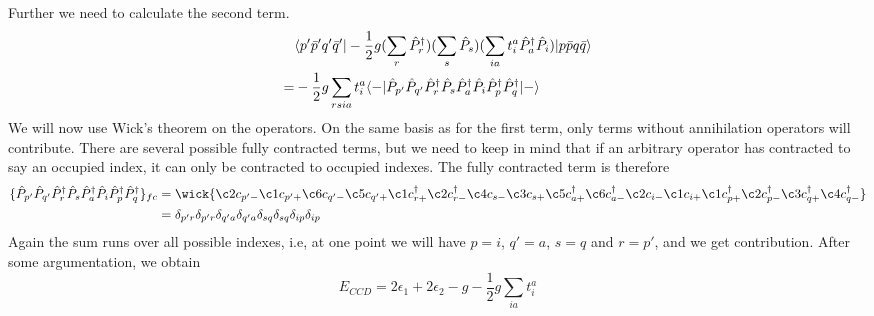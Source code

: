 \documentclass[norsk,a4paper,12pt]{article}
\begin{document}
Further we need to calculate the second term. 
\begin{align*}
&\langle p'\bar{p}'q'\bar{q}'|-\frac{1}{2}g(\sum_{r}\hat{P}_r^{\dagger})(\sum_s\hat{P}_s)(\sum_{ia}t_i^a\hat{P}_a^{\dagger}\hat{P}_i)|p\bar{p}q\bar{q}\rangle\notag\\
=&-\frac{1}{2}g\sum_{rsia}t_i^a\langle-|\hat{P}_{p'}\hat{P}_{q'}\hat{P}_r^{\dagger}\hat{P}_s\hat{P}_a^{\dagger}\hat{P}_i\hat{P}_p^{\dagger}\hat{P}_q^{\dagger}|-\rangle
\end{align*}
We will now use Wick's theorem on the operators. On the same basis as for the first term, only terms without annihilation operators will contribute. There are several possible fully contracted terms, but we need to keep in mind that if an arbitrary operator has contracted to say an occupied index, it can only be contracted to occupied indexes. The fully contracted term is therefore 
\begin{align*}
\{\hat{P}_{p'}\hat{P}_{q'}\hat{P}_r^{\dagger}\hat{P}_s\hat{P}_a^{\dagger}\hat{P}_i\hat{P}_p^{\dagger}\hat{P}_q^{\dagger}\}_{fc}
&=\wick{\c2 c_{p'-}\c1 c_{p'+}\c6 c_{q'-}\c5 c_{q'+}\c1 c_{r+}^{\dagger}\c2 c_{r-}^{\dagger}\c4 c_{s-}\c3 c_{s+}\c5 c_{a+}^{\dagger}\c6 c_{a-}^{\dagger}\c2 c_{i-}\c1 c_{i+}\c1 c_{p+}^{\dagger}\c2 c_{p-}^{\dagger}\c3 c_{q+}^{\dagger}\c4 c_{q-}^{\dagger}}\\
&=\delta_{p'r}\delta_{p'r}\delta_{q'a}\delta_{q'a}\delta_{sq}\delta_{sq}\delta_{ip}\delta_{ip}
\end{align*}
Again the sum runs over all possible indexes, i.e, at one point we will have $p=i$, $q'=a$, $s=q$ and $r=p'$, and we get contribution. After some argumentation, we obtain
\begin{equation}
E_{CCD}=2\epsilon_1+2\epsilon_2-g-\frac{1}{2}g\sum_{ia}t_i^a
\end{equation}
\end{document}
